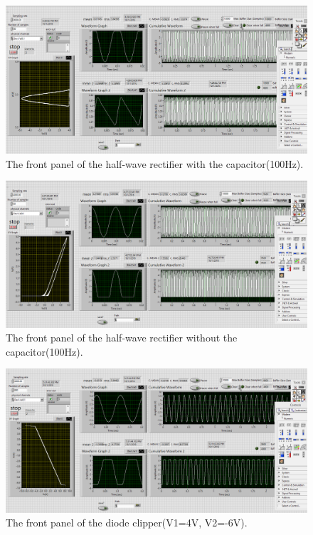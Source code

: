 \documentclass[11pt]{article}
\begin{document}
\begin{figure}[H]
 \begin{center}
  \includegraphics[width=\linewidth/1]{act5acapac100Hz}
  \caption{The front panel of the half-wave rectifier with the capacitor(100Hz).}
  \label{fig:act5acapac100Hz}
 \end{center}
\end{figure}

\begin{figure}[H]
 \begin{center}
  \includegraphics[width=\linewidth/1]{act5anocapac100Hz}
  \caption{The front panel of the half-wave rectifier without the capacitor(100Hz).}
  \label{fig:act5anocapac100Hz}
 \end{center}
\end{figure}

\begin{figure}[H]
 \begin{center}
  \includegraphics[width=\linewidth/1]{act5b10Hz4v-6v}
  \caption{The front panel of the diode clipper(V1=4V, V2=-6V).}
  \label{fig:act5b10Hz4v-6v}
 \end{center}
\end{figure}
\end{document}
